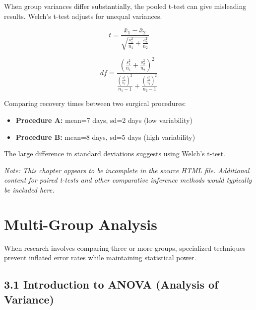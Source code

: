 \documentclass[
  11pt,
  letterpaper,
  oneside]{book}
\providecommand{\tightlist}{%
  \setlength{\itemsep}{0pt}\setlength{\parskip}{0pt}}\usepackage{longtable,booktabs,array}
\begin{document}
When group variances differ substantially, the pooled t-test can give
misleading results. Welch's t-test adjusts for unequal variances.

\[t = \frac{\bar{x}_1 - \bar{x}_2}{\sqrt{\frac{s_1^2}{n_1} + \frac{s_2^2}{n_2}}}\]

\[df = \frac{\left(\frac{s_1^2}{n_1} + \frac{s_2^2}{n_2}\right)^2}{\frac{\left(\frac{s_1^2}{n_1}\right)^2}{n_1-1} + \frac{\left(\frac{s_2^2}{n_2}\right)^2}{n_2-1}}\]

\begin{tcolorbox}[enhanced jigsaw, coltitle=black, left=2mm, colback=white, title=\textcolor{quarto-callout-tip-color}{\faLightbulb}\hspace{0.5em}{When Variances Differ}, opacitybacktitle=0.6, titlerule=0mm, bottomtitle=1mm, colbacktitle=quarto-callout-tip-color!10!white, colframe=quarto-callout-tip-color-frame, breakable, bottomrule=.15mm, opacityback=0, toptitle=1mm, rightrule=.15mm, leftrule=.75mm, arc=.35mm, toprule=.15mm]

Comparing recovery times between two surgical procedures:

\begin{itemize}
\tightlist
\item
  \textbf{Procedure A:} mean=7 days, sd=2 days (low variability)
\item
  \textbf{Procedure B:} mean=8 days, sd=5 days (high variability)
\end{itemize}

The large difference in standard deviations suggests using Welch's
t-test.

\end{tcolorbox}

\emph{Note: This chapter appears to be incomplete in the source HTML
file. Additional content for paired t-tests and other comparative
inference methods would typically be included here.}


\chapter{Multi-Group Analysis}\label{multi-group-analysis}

When research involves comparing three or more groups, specialized
techniques prevent inflated error rates while maintaining statistical
power.

\section{3.1 Introduction to ANOVA (Analysis of
Variance)}\label{introduction-to-anova-analysis-of-variance}
\end{document}
